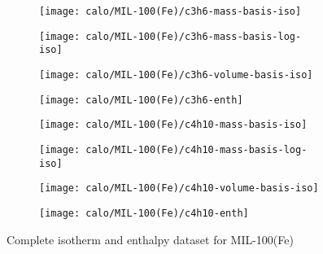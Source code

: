 \begin{figure}[H]
    \begin{subfigure}{0.25\textwidth}
        \texttt{[image: calo/MIL-100(Fe)/c3h6-mass-basis-iso]}%
        \label{appx:fgr:shaping:mil100c3h6mass}
    \end{subfigure}%
    \begin{subfigure}{0.25\textwidth}
        \texttt{[image: calo/MIL-100(Fe)/c3h6-mass-basis-log-iso]}%
        \label{appx:fgr:shaping:mil100c3h6masslog}
    \end{subfigure}%
    \begin{subfigure}{0.25\textwidth}
        \texttt{[image: calo/MIL-100(Fe)/c3h6-volume-basis-iso]}%
        \label{appx:fgr:shaping:mil100c3h6volume}
    \end{subfigure}%
    \begin{subfigure}{0.25\textwidth}
        \texttt{[image: calo/MIL-100(Fe)/c3h6-enth]}%
        \label{appx:fgr:shaping:mil100c3h6enth}
    \end{subfigure}%

    \begin{subfigure}{0.25\textwidth}
        \texttt{[image: calo/MIL-100(Fe)/c4h10-mass-basis-iso]}%
        \label{appx:fgr:shaping:mil100c4h10mass}
    \end{subfigure}%
    \begin{subfigure}{0.25\textwidth}
        \texttt{[image: calo/MIL-100(Fe)/c4h10-mass-basis-log-iso]}%
        \label{appx:fgr:shaping:mil100c4h10masslog}
    \end{subfigure}%
    \begin{subfigure}{0.25\textwidth}
        \texttt{[image: calo/MIL-100(Fe)/c4h10-volume-basis-iso]}%
        \label{appx:fgr:shaping:mil100c4h10volume}
    \end{subfigure}%
    \begin{subfigure}{0.25\textwidth}
        \texttt{[image: calo/MIL-100(Fe)/c4h10-enth]}%
        \label{appx:fgr:shaping:mil100c4h10enth}
    \end{subfigure}%

    \caption{Complete isotherm and enthalpy dataset for MIL-100(Fe)}%
    \label{appx:fgr:shaping:calomil100}
\end{figure}
